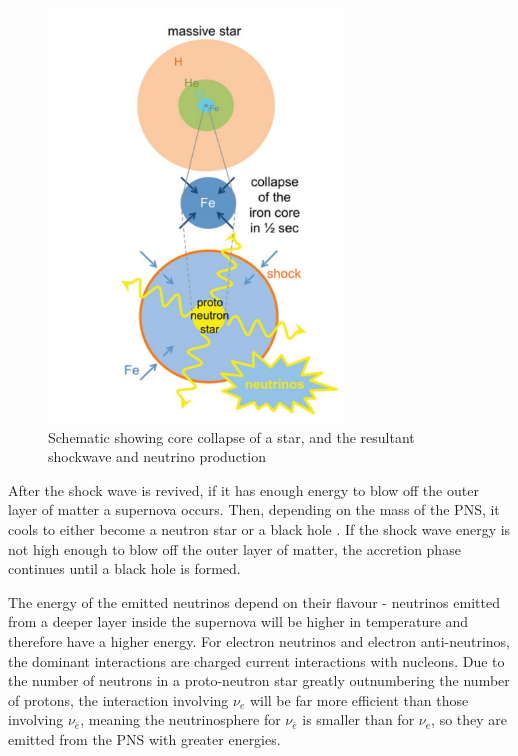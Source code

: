 \begin{figure}
    \centering
    \includegraphics[width=0.7\textwidth]{Figures/ccsn_mechanism.png}
    \caption{Schematic showing core collapse of a star, and the resultant shockwave and neutrino production}
    \label{fig:ccsn_mechanism}
\end{figure}

After the shock wave is revived, if it has enough energy to blow off the outer layer of matter a supernova occurs. Then, depending on the mass of the PNS, it cools to either become a neutron star or a black hole \cite{o2011black}. If the shock wave energy is not high enough to blow off the outer layer of matter, the accretion phase continues until a black hole is formed.
\newline

The energy of the emitted neutrinos depend on their flavour - neutrinos emitted from a deeper layer inside the supernova will be higher in temperature and therefore have a higher energy. For electron neutrinos and electron anti-neutrinos, the dominant interactions are charged current interactions with nucleons. Due to the number of neutrons in a proto-neutron star greatly outnumbering the number of protons, the interaction involving $\nu_{e}$ will be far more efficient than those involving $\nu_{\bar{e}}$, meaning the neutrinosphere for $\nu_{\bar{e}}$ is smaller than for $\nu_{e}$, so they are emitted from the PNS with greater energies. 

